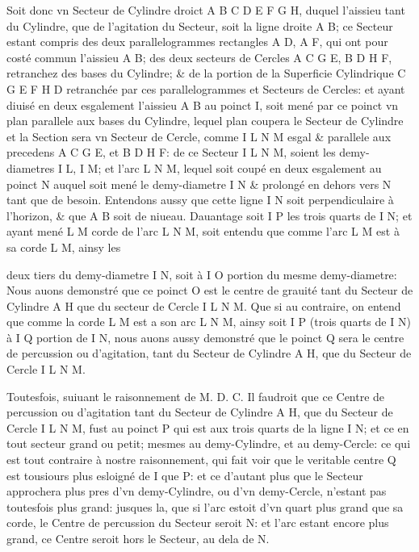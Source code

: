 \documentclass[11pt,a4paper]{article}
\begin{document}
Soit donc vn Secteur de Cylindre droict A B C D E F G H, duquel l'aissieu tant du Cylindre, que de l'agitation du Secteur, soit la ligne droite A B; ce Secteur estant compris des deux parallelogrammes rectangles A D, A F, qui ont pour costé commun l'aissieu A B; des deux secteurs de Cercles A C G E, B D H F, retranchez des bases du Cylindre; \& de la portion de la Superficie Cylindrique C G E F H D retranchée par ces parallelogrammes et Secteurs de Cercles: et ayant diuisé en deux esgalement l'aissieu A B au poinct I, soit mené par ce poinct vn plan parallele aux bases du Cylindre, lequel plan coupera le Secteur de Cylindre et la Section sera vn Secteur de Cercle, comme I L N M esgal \& parallele aux precedens A C G E, et B D H F: de ce Secteur I L N M, soient les demy-diametres I L, I M; et l'arc L N M, lequel soit coupé en deux esgalement au poinct N auquel soit mené le demy-diametre I N \& prolongé en dehors vers N tant que de besoin. Entendons aussy que cette ligne I N soit perpendiculaire à l'horizon, \& que A B soit de niueau. Dauantage soit I P les trois quarts de I N; et ayant mené L M corde de l'arc L N M, soit entendu que comme l'arc L M est à sa corde L M, ainsy les


deux tiers du demy-diametre I N, soit à I O portion du mesme demy-diametre: Nous auons demonstré que ce poinct O est le centre de grauité tant du Secteur de Cylindre A H que du secteur de Cercle I L N M. Que si au contraire, on entend que comme la corde L M est a son arc L N M, ainsy soit I P (trois quarts de I N) à I Q portion de I N, nous auons aussy demonstré que le poinct Q sera le centre de percussion ou d'agitation, tant du Secteur de Cylindre A H, que du Secteur de Cercle I L N M.

Toutesfois, suiuant le raisonnement de M. D. C. Il faudroit que ce Centre de percussion ou d'agitation tant du Secteur de Cylindre A H, que du Secteur de Cercle I L N M, fust au poinct P qui est aux trois quarts de la ligne I N; et ce en tout secteur grand ou petit; mesmes au demy-Cylindre, et au demy-Cercle: ce qui est tout contraire à nostre raisonnement, qui fait voir que le veritable centre Q est tousiours plus esloigné de I que P: et ce d'autant plus que le Secteur approchera plus pres d'vn demy-Cylindre, ou d'vn demy-Cercle, n'estant pas toutesfois plus grand: jusques la, que si l'arc estoit d'vn quart plus grand que sa corde, le Centre de percussion du Secteur seroit N: et l'arc estant encore plus grand, ce Centre seroit hors le Secteur, au dela de N.
\end{document}
